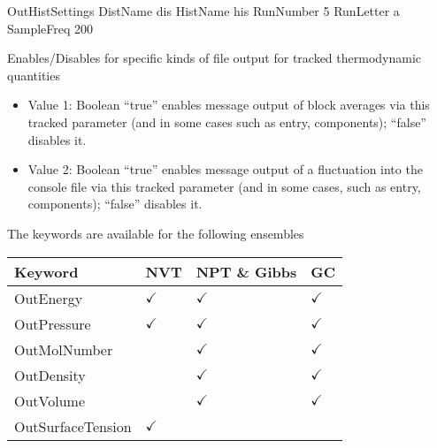 \documentclass[letterpaper,10pt,english]{sphinxmanual}
\begin{document}
\begin{description}
\begin{itemize}
\end{itemize}

\begin{sphinxVerbatim}[commandchars=\\\{\}]
\PYGZsh{}\PYGZsh{}\PYGZsh{}\PYGZsh{}\PYGZsh{}\PYGZsh{}\PYGZsh{}\PYGZsh{}\PYGZsh{}\PYGZsh{}\PYGZsh{}\PYGZsh{}\PYGZsh{}\PYGZsh{}\PYGZsh{}\PYGZsh{}\PYGZsh{}\PYGZsh{}\PYGZsh{}\PYGZsh{}\PYGZsh{}\PYGZsh{}\PYGZsh{}\PYGZsh{}\PYGZsh{}\PYGZsh{}\PYGZsh{}\PYGZsh{}\PYGZsh{}\PYGZsh{}\PYGZsh{}\PYGZsh{}\PYGZsh{}
\PYGZsh{} OutHistSettings
\PYGZsh{}\PYGZsh{}\PYGZsh{}\PYGZsh{}\PYGZsh{}\PYGZsh{}\PYGZsh{}\PYGZsh{}\PYGZsh{}\PYGZsh{}\PYGZsh{}\PYGZsh{}\PYGZsh{}\PYGZsh{}\PYGZsh{}\PYGZsh{}\PYGZsh{}\PYGZsh{}\PYGZsh{}\PYGZsh{}\PYGZsh{}\PYGZsh{}\PYGZsh{}\PYGZsh{}\PYGZsh{}\PYGZsh{}\PYGZsh{}\PYGZsh{}\PYGZsh{}\PYGZsh{}\PYGZsh{}\PYGZsh{}\PYGZsh{}
DistName   dis
HistName   his
RunNumber  5
RunLetter  a
SampleFreq 200
\end{sphinxVerbatim}

\item[{\sphinxcode{\sphinxupquote{OutEnergy, OutPressure, OutMolNumber, OutDensity, OutVolume, OutSurfaceTension}}}] \leavevmode
Enables/Disables for specific kinds of file output for tracked thermodynamic quantities
\begin{itemize}
\item {} 
Value 1: Boolean \textendash{} “true” enables message output of block averages via this tracked parameter (and in some cases such as entry, components); “false” disables it.

\item {} 
Value 2: Boolean \textendash{} “true” enables message output of a fluctuation into the console file via this tracked parameter (and in some cases, such as entry, components); “false” disables it.

\end{itemize}

The keywords are available for the following ensembles


\begin{savenotes}\sphinxattablestart
\centering
\begin{tabulary}{\linewidth}[t]{|T|T|T|T|}
\hline
\sphinxstyletheadfamily 
Keyword
&\sphinxstyletheadfamily 
NVT
&\sphinxstyletheadfamily 
NPT \& Gibbs
&\sphinxstyletheadfamily 
GC
\\
\hline
OutEnergy
&
\(\checkmark\)
&
\(\checkmark\)
&
\(\checkmark\)
\\
\hline
OutPressure
&
\(\checkmark\)
&
\(\checkmark\)
&
\(\checkmark\)
\\
\hline
OutMolNumber
&&
\(\checkmark\)
&
\(\checkmark\)
\\
\hline
OutDensity
&&
\(\checkmark\)
&
\(\checkmark\)
\\
\hline
OutVolume
&&
\(\checkmark\)
&
\(\checkmark\)
\\
\hline
OutSurfaceTension
&
\(\checkmark\)
&&\\
\hline
\end{tabulary}
\par
\sphinxattableend\end{savenotes}


\end{description}
\end{document}

